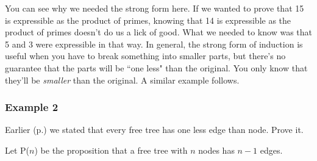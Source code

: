 You can see why we needed the strong form here. If we wanted to prove that
15 is expressible as the product of primes, knowing that 14 is expressible
as the product of primes doesn't do us a lick of good. What we needed to
know was that 5 and 3 were expressible in that way. In general, the strong
form of induction is useful when you have to break something into smaller
parts, but there's no guarantee that the parts will be ``one less" than the
original. You only know that they'll be \textit{smaller} than the original.
A similar example follows.

\subsubsection{Example 2}

Earlier (p.\pageref{onelessedge}) we stated that every free tree has one less
edge than node. Prove it.

Let P($n$) be the proposition that a free tree with $n$ nodes has $n-1$
edges.

